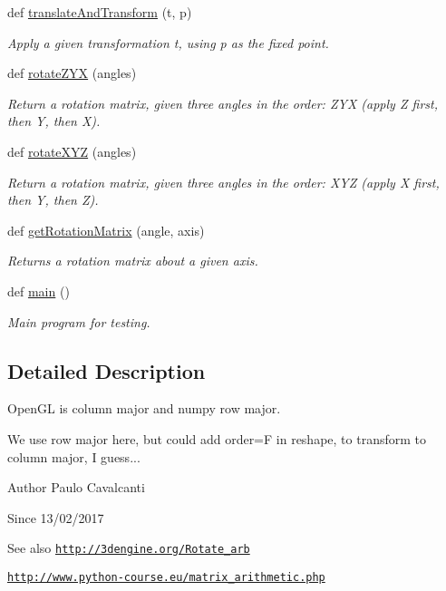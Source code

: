 \begin{DoxyCompactItemize}
def \hyperlink{namespacematrix_a124af7b52efe8716b3a20db8204f3530}{translate\+And\+Transform} (t, p)
\begin{DoxyCompactList}\small\item\em Apply a given transformation t, using p as the fixed point. \end{DoxyCompactList}\item 
def \hyperlink{namespacematrix_a6f88dcffb304ec9fabe5f5c7dfafa836}{rotate\+Z\+YX} (angles)
\begin{DoxyCompactList}\small\item\em Return a rotation matrix, given three angles in the order\+: Z\+YX (apply Z first, then Y, then X). \end{DoxyCompactList}\item 
def \hyperlink{namespacematrix_a6ec9bcea96b6f86fa8310972f553868e}{rotate\+X\+YZ} (angles)
\begin{DoxyCompactList}\small\item\em Return a rotation matrix, given three angles in the order\+: X\+YZ (apply X first, then Y, then Z). \end{DoxyCompactList}\item 
def \hyperlink{namespacematrix_ade61e3d860067b059336746b261edb3c}{get\+Rotation\+Matrix} (angle, axis)
\begin{DoxyCompactList}\small\item\em Returns a rotation matrix about a given axis. \end{DoxyCompactList}\item 
def \hyperlink{namespacematrix_a9d2cb91b2ffd4a895f50de0376bf3462}{main} ()
\begin{DoxyCompactList}\small\item\em Main program for testing. \end{DoxyCompactList}\end{DoxyCompactItemize}


\subsection{Detailed Description}
Open\+GL is column major and numpy row major. 

We use row major here, but could add order=\textquotesingle{}F\textquotesingle{} in reshape, to transform to column major, I guess...

\begin{DoxyAuthor}{Author}
Paulo Cavalcanti 
\end{DoxyAuthor}
\begin{DoxySince}{Since}
13/02/2017 
\end{DoxySince}
\begin{DoxySeeAlso}{See also}
\href{http://3dengine.org/Rotate_arb}{\tt http\+://3dengine.\+org/\+Rotate\+\_\+arb} 

\href{http://www.python-course.eu/matrix_arithmetic.php}{\tt http\+://www.\+python-\/course.\+eu/matrix\+\_\+arithmetic.\+php} 
\end{DoxySeeAlso}


